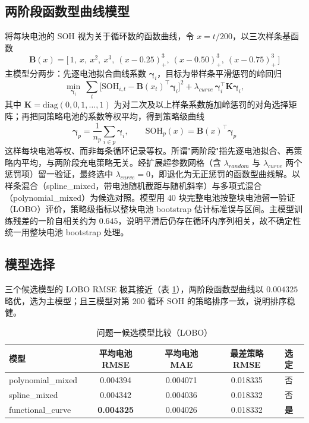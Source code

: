 \documentclass[withoutpreface,bwprint]{cumcmthesis}
\begin{document}
\subsection{两阶段函数型曲线模型}
将每块电池的 SOH 视为关于循环数的函数曲线，令 $x=t/200$，以三次样条基函数
\begin{equation}
\bm B(x)=\big[\,1,\ x,\ x^2,\ x^3,\ (x-0.25)_+^3,\ (x-0.50)_+^3,\ (x-0.75)_+^3\,\big]
\end{equation}
主模型分两步：先逐电池拟合曲线系数 $\bm\gamma_i$，目标为带样条平滑惩罚的岭回归
\begin{equation}
\min_{\bm\gamma_i}\ \sum_{t}\big[\mathrm{SOH}_{i,t}-\bm B(x_t)^\top\bm\gamma_i\big]^2+\lambda_{curve}\,\bm\gamma_i^\top\bm K\bm\gamma_i,
\end{equation}
其中 $\bm K=\mathrm{diag}(0,0,1,\dots,1)$ 为对二次及以上样条系数施加岭惩罚的对角选择矩阵；再把同策略电池的系数等权平均，得到策略级曲线
\begin{equation}
\boxed{\bm\gamma_p=\frac{1}{n_p}\sum_{i\in p}\bm\gamma_i,\qquad \mathrm{SOH}_p(x)=\bm B(x)^\top\bm\gamma_p}
\end{equation}
这样每块电池等权、而非每条循环记录等权。所谓"两阶段"指先逐电池拟合、再策略内平均，与两阶段充电策略无关。经扩展超参数网格（含 $\lambda_{random}$ 与 $\lambda_{curve}$ 两个惩罚项）留一验证，最终选中 $\lambda_{curve}=0$，即退化为无正惩罚的函数型曲线解。以样条混合（spline\_mixed，带电池随机截距与随机斜率）与多项式混合（polynomial\_mixed）为候选对照。模型用 40 块完整电池按整块电池留一验证（LOBO）评价，策略级指标以整块电池 bootstrap 估计标准误与区间。主模型训练残差的一阶自相关约为 $0.645$，说明平滑后仍存在循环内序列相关，故不确定性统一用整块电池 bootstrap 处理。

\subsection{模型选择}
三个候选模型的 LOBO RMSE 极其接近（表 \ref{tab:q1_model}），两阶段函数型曲线以 $0.004325$ 略优，选为主模型；且三模型对第 200 循环 SOH 的策略排序一致，说明排序稳健。

\begin{table}[H]\centering
\caption{问题一候选模型比较（LOBO）}\label{tab:q1_model}
\begin{tabular}{lcccl}
\toprule
模型 & 平均电池 RMSE & 平均电池 MAE & 最差策略 RMSE & 选定\\
\midrule
polynomial\_mixed & 0.004394 & 0.004071 & 0.018335 & 否\\
spline\_mixed & 0.004342 & 0.004036 & 0.018332 & 否\\
functional\_curve & \textbf{0.004325} & 0.004026 & 0.018332 & \textbf{是}\\
\bottomrule
\end{tabular}
\end{table}
\end{document}

